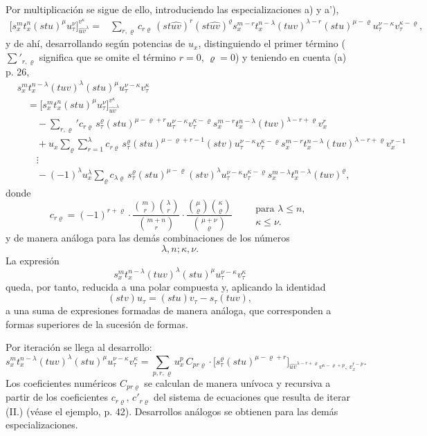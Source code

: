 \documentclass[11pt]{article}
\begin{document}
Por multiplicación se sigue de ello, introduciendo las especializaciones a) y a'),
\[
\begin{aligned}
\bigl[s_x^m t_x^n(stu)^\mu u_\tau^\nu\bigr]_{\widehat{uv}^{\lambda}}^{v^\kappa}
={}&
\sum_{r,\varrho}c_{r\varrho}\,
(st\widehat{uv})^r(st\widehat{uv})^\varrho
s_x^{m-r}t_x^{n-\lambda}(tuv)^{\lambda-r}(stu)^{\mu-\varrho}
u_\tau^{\nu-\kappa}v_\tau^{\kappa-\varrho},
\end{aligned}
\]
y de ahí, desarrollando según potencias de $u_x$, distinguiendo el primer término ($\sum'_{r,\varrho}$ significa que se omite el término $r=0$, $\varrho=0$) y teniendo en cuenta (a) p. 26,
\[
\tag{II}
\begin{aligned}
&s_x^m t_x^{n-\lambda}(tuv)^\lambda(stu)^\mu u_\tau^{\nu-\kappa}v_\tau^\kappa\\
&\quad =
\bigl[s_x^m t_x^n(stu)^\mu u_\tau^\nu\bigr]_{\widehat{uv}^{\lambda}}^{v^\kappa}\\
&\qquad
-\sum_{r,\varrho}' c_{r\varrho}\,s_\tau^\varrho(stu)^{\mu-\varrho+r}
u_\tau^{\nu-\kappa}v_\tau^{\kappa-\varrho}
s_x^{m-r}t_x^{n-\lambda}(tuv)^{\lambda-r+\varrho}v_x^r\\
&\qquad
+u_x\sum_{\varrho}\sum_{r=1}^{\lambda} c_{r\varrho}\,
s_\tau^\varrho(stu)^{\mu-\varrho+r-1}(stv)
u_\tau^{\nu-\kappa}v_\tau^{\kappa-\varrho}
s_x^{m-r}t_x^{n-\lambda}(tuv)^{\lambda-r+\varrho}v_x^{r-1}\\
&\qquad
\vdots\\
&\qquad
-(-1)^\lambda u_x^\lambda\sum_\varrho c_{\lambda\varrho}\,
s_\tau^\varrho(stu)^{\mu-\varrho}(stv)^\lambda
u_\tau^{\nu-\kappa}v_\tau^{\kappa-\varrho}
s_x^{m-\lambda}t_x^{n-\lambda}(tuv)^\varrho,
\end{aligned}
\]
donde
\[
c_{r\varrho}=(-1)^{r+\varrho}\cdot
\frac{\binom{m}{r}\binom{\lambda}{r}}{\binom{m+n}{r}}\cdot
\frac{\binom{\mu}{\varrho}\binom{\kappa}{\varrho}}{\binom{\mu+\nu}{\varrho}}
\qquad
\begin{array}{l}
\text{para }\lambda\le n,\\
\kappa\le\nu.
\end{array}
\]
y de manera análoga para las demás combinaciones de los números
\[\lambda,n;\kappa,\nu.\]
La expresión
\[s_x^m t_x^{n-\lambda}(tuv)^\lambda(stu)^\mu u_\tau^{\nu-\kappa}v_\tau^\kappa\]
queda, por tanto, reducida a una polar compuesta y, aplicando la identidad
\[
(stv)u_\tau=(stu)v_\tau-s_\tau(tuv),
\]
a una suma de expresiones formadas de manera análoga, que corresponden a formas superiores de la sucesión de formas.

Por iteración se llega al desarrollo:
\[
\tag{III}
s_x^m t_x^{n-\lambda}(tuv)^\lambda(stu)^\mu u_\tau^{\nu-\kappa}v_\tau^\kappa
=
\sum_{p,r,\varrho}u_x^p\,C_{pr\varrho}\cdot
\bigl[s_\tau^\varrho(stu)^{\mu-\varrho+r}\bigr]_{\widehat{uv}^{\lambda-r+\varrho}v^{\kappa-\varrho+p},\,v_x^{r-p}}.
\]
Los coeficientes numéricos $C_{pr\varrho}$ se calculan de manera unívoca y recursiva a partir de los coeficientes $c_{r\varrho}$, $c'_{r\varrho}$ del sistema de ecuaciones que resulta de iterar (II.) (véase el ejemplo, p. 42). Desarrollos análogos se obtienen para las demás especializaciones.
\end{document}
